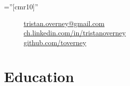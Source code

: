 \documentclass[a4paper,11pt]{article} %
\begin{document}
\pagestyle{empty} %

\font\fb=''[cmr10]'' %



\par{
\bigskip
\par
} %

\begin{figure}
\vspace{-3.8cm}
\footnotesize

\begin{flushright}

\href{mailto:tristan.overney@gmail.com}{tristan.overney@gmail.com} 
\hspace{0.1cm}
\faEnvelope{}
\\ 

\href{https://www.linkedin.com/in/tristanoverney}{ch.linkedin.com/in/tristanoverney}
\hspace{0.1cm}
\faLinkedin{}
\\

\href{https://github.com/toverney}{github.com/toverney}
\hspace{0.1cm} 
\faGithub{}
\\


\end{flushright}

\end{figure}


\section{Education}
\end{document}
